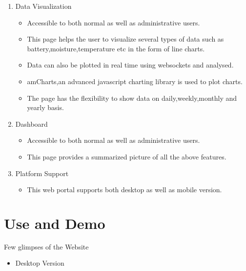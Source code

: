 \documentclass[a4paper,12pt,oneside]{book}
\begin{document}
\begin{enumerate}
\begin{itemize}
\begin{enumerate}
\begin{itemize}
                    
                \end{itemize}
            \item{Data Visualization}
            \begin{itemize}
                \item{Accessible to both normal as well as administrative users.}
                \item{This page helps the user to visualize several types of data such as battery,moisture,temperature etc in the form of line charts.}
                \item{ Data can also be plotted in real time using websockets and analysed.}
                \item{amCharts,an advanced javascript charting library is used to plot charts.}
                \item{The page has the flexibility to show data on daily,weekly,monthly and yearly basis.}
            \end{itemize}    
           
          
           \item{Dashboard}
            \begin{itemize}
                \item{Accessible to both normal as well as administrative users.}
                \item{This page provides a summarized picture of all the above features.}
            \end{itemize}
            
            \item{Platform Support}
            \begin{itemize}
                
                \item{This web portal supports both desktop as well as mobile version.}
            \end{itemize}
        \end{enumerate}
\end{itemize}

  

\newpage
\section{Use and Demo}
\hspace{7mm}Few glimpses of the Website
\begin{itemize}
\item{Desktop Version}


\end{itemize}
\end{enumerate}
\end{document}
